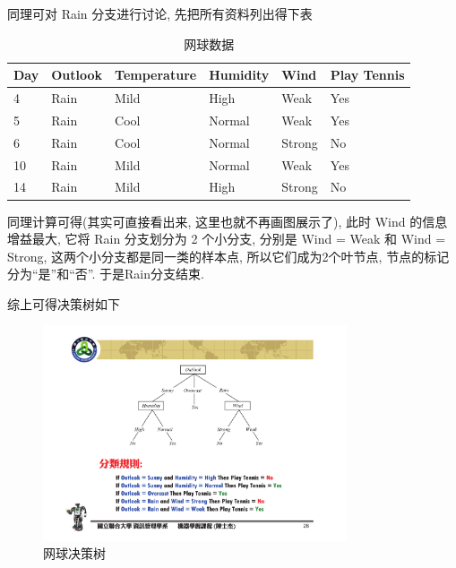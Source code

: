 \documentclass[a4paper,UTF8]{ctexart}
\theoremstyle{plain} \newtheorem{theorem}{定理}[section]
\theoremstyle{plain} \newtheorem{definition}{定义}[section]
\theoremstyle{plain} \newtheorem{lemma}{引理}[section]
\theoremstyle{plain} \newtheorem{proposition}{命题}[section]
\theoremstyle{plain} \newtheorem{example}{例}
\theoremstyle{plain} \newtheorem{remark}{注}
\theoremstyle{plain} \newtheorem{corollary}{推论}[section]
\begin{document}
同理可对 Rain 分支进行讨论, 先把所有资料列出得下表
\begin{table}[!htb]
\centering
\caption{网球数据}
\label{rain}
\begin{tabular}{l|l|l|l|l|l}
  \hline
    \textbf{Day} & \textbf{Outlook} & \textbf{Temperature} & \textbf{Humidity} & \textbf{Wind} & \textbf{Play Tennis} \\
    \hline
    4 & Rain & Mild & High & Weak & Yes \\ 
    \hline
    5 & Rain & Cool & Normal & Weak & Yes \\ 
    \hline
    6 & Rain & Cool & Normal & Strong &  No \\ 
    \hline
    10 & Rain & Mild & Normal & Weak & Yes \\ 
    \hline
    14 & Rain & Mild & High & Strong & No \\ 
  \hline
\end{tabular}
\end{table}

同理计算可得(其实可直接看出来, 这里也就不再画图展示了), 此时 Wind 的信息增益最大, 它将 Rain 分支划分为 2 个小分支, 分别是 Wind = Weak 和 Wind = Strong, 这两个小分支都是同一类的样本点, 所以它们成为2个叶节点, 节点的标记分为“是”和“否”. 于是Rain分支结束.

综上可得决策树如下
\begin{figure}[!htb]
	\centering
	\includegraphics[width=0.80\textwidth]{table-tree.pdf}
	\caption{网球决策树}
	\label{tabletree}
\end{figure}
\end{document}
